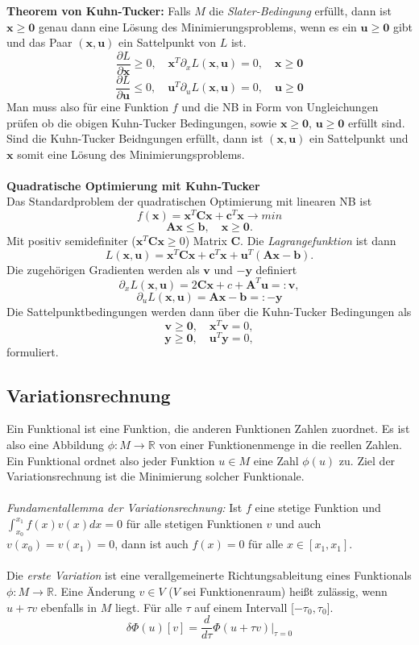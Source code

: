 		\textbf{Theorem von Kuhn-Tucker:} Falls $ M $ die \textit{Slater-Bedingung} erfüllt, dann ist $ \bm{x} \geq \bm{0} $ genau dann eine Lösung des Minimierungsproblems, wenn es ein $ \bm{u} \geq \bm{0} $ gibt und das Paar $ (\bm{x,u}) $ ein Sattelpunkt von $ L $ ist.
		\[\frac{\partial L}{\partial \bm{x}} \geq 0, \quad \bm{x}^{T}\partial_{x} L(\bm{x,u}) = 0, \quad \bm{x} \geq \bm{0} \]
		\[\frac{\partial L}{\partial \bm{u}} \leq 0, \quad \bm{u}^{T}\partial_{u} L(\bm{x,u}) = 0,  \quad \bm{u} \geq \bm{0}\]
		Man muss also für eine Funktion $ f $ und die NB in Form von Ungleichungen prüfen ob die obigen Kuhn-Tucker Bedingungen, sowie $ \bm{x} \geq \bm{0} $, $ \bm{u} \geq \bm{0} $ erfüllt sind. Sind die Kuhn-Tucker Beidngungen erfüllt, dann ist $ (\bm{x,u}) $ ein Sattelpunkt und $ \bm{x} $ somit eine Lösung des Minimierungsproblems.
		\leavevmode \\\\
		\textbf{Quadratische Optimierung mit Kuhn-Tucker}\\
		Das Standardproblem der quadratischen Optimierung mit linearen NB ist
		\[f(\bm{x}) = \bm{x}^{T}\bm{Cx} + \bm{c}^{T}\bm{x} \rightarrow min\]
		\[\bm{Ax} \leq \bm{b}, \quad \bm{x} \geq \bm{0}.\]
		Mit positiv semidefiniter ($ \bm{x}^{T}\bm{Cx} \geq 0 $) Matrix $ \bm{C} $. Die \textit{Lagrangefunktion} ist dann
		\[L(\bm{x,u}) = \bm{x}^{T}\bm{Cx} + \bm{c}^{T}\bm{x} + \bm{u}^{T}(\bm{Ax} - \bm{b}).\]
		Die zugehörigen Gradienten werden als $ \bm{v} $ und $ \bm{-y} $ definiert
		\[\partial_{x} L(\bm{x,u}) = 2\bm{Cx} + c + \bm{A}^{T}\bm{u} =: \bm{v},\]
		\[\partial_{u} L(\bm{x,u}) = \bm{Ax} - \bm{b} =: \bm{-y}\]
		Die Sattelpunktbedingungen werden dann über die Kuhn-Tucker Bedingungen als
		\[\bm{v} \geq \bm{0}, \quad \bm{x}^{T}\bm{v} = 0,\]
		\[\bm{y} \geq \bm{0}, \quad \bm{u}^{T}\bm{y} = 0,\]
		formuliert.
	\subsection{Variationsrechnung}
		Ein Funktional ist eine Funktion, die anderen Funktionen Zahlen zuordnet. Es ist also eine Abbildung $ \phi : M \rightarrow \mathbb{R} $ von einer Funktionenmenge in die reellen Zahlen. Ein Funktional ordnet also jeder Funktion $ u \in M $ eine Zahl $ \phi(u) $ zu. Ziel der Variationsrechnung ist die Minimierung solcher Funktionale.\\\\
		\textit{Fundamentallemma der Variationsrechnung:} Ist $ f $ eine stetige Funktion und $ \int_{x_{0}}^{x_{1}}f(x)v(x)dx = 0 $ für alle stetigen Funktionen $ v $ und auch $ v(x_{0}) = v(x_{1}) = 0 $, dann ist auch $ f(x) = 0 $ für alle $ x \in [x_{1},x_{1}] $.\\\\
		Die \textit{erste Variation} ist eine verallgemeinerte Richtungsableitung eines Funktionals $ \phi : M \rightarrow \mathbb{R} $. Eine Änderung $ v \in V $ ($ V $ sei Funktionenraum) heißt zulässig, wenn $ u + \tau v $ ebenfalls in $ M $ liegt. Für alle $ \tau $ auf einem Intervall [$ -\tau_{0},\tau_{0} $].
		\[\delta \Phi(u)[v] = \frac{d}{d\tau}\Phi(u + \tau v)\bigg|_{\tau=0}\]

